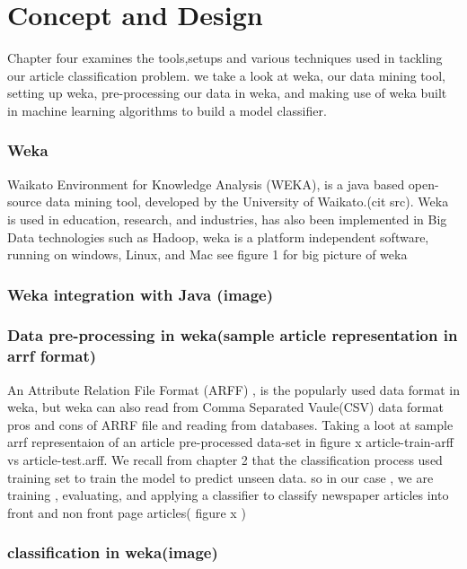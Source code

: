\chapter{Concept and Design}

Chapter four examines the tools,setups and various techniques used in tackling our article  classification problem.  we  take a look at weka, our data mining tool,  setting up weka, pre-processing our data in weka, and  making use of weka built in machine learning algorithms to build a model classifier.

\subsection{Weka}
Waikato Environment for Knowledge Analysis (WEKA), is  a java based open-source data mining tool, developed by the University of Waikato.(cit src). Weka is used in education, research, and industries, has also  been implemented in Big Data technologies such as Hadoop, weka is a platform independent software, running on windows, Linux, and Mac see figure 1 for big picture of weka
\subsection{Weka integration with Java (image)}

\subsection{ Data pre-processing in weka(sample article representation in arrf format)}
An Attribute Relation File Format (ARFF) , is the popularly used data format in weka, but weka can also read from Comma Separated Vaule(CSV) data format
pros and cons of ARRF file and reading from databases.
Taking a loot at sample arrf representaion of an article pre-processed data-set in figure x
article-train-arff vs article-test.arff.
We recall from chapter  2 that the classification process used training set to train the model to predict unseen data. so in our case , we are training , evaluating, and applying a classifier to classify newspaper articles into front and non front page articles( figure x )
\subsection{ classification in weka(image)}


